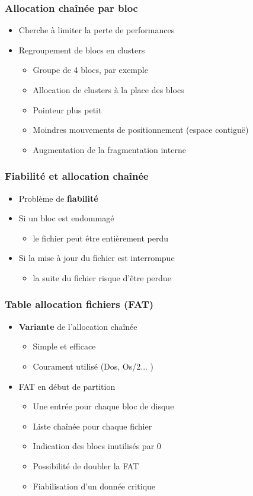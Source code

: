 \begin{frame}
\frametitle{Allocation chaînée par bloc}
\begin{itemize}
\item Cherche à limiter la perte de performances
\item Regroupement de blocs en clusters
\begin{itemize}
\item Groupe de 4 blocs, par exemple
\item Allocation de clusters à la place des blocs
\item Pointeur plus petit
\item Moindres mouvements de positionnement (espace contiguë)
\item Augmentation de la fragmentation interne
\end{itemize}
\end{itemize}
\end{frame}

\begin{frame}
\frametitle{Fiabilité et allocation chaînée}
\begin{itemize}
\item Problème de \textbf{fiabilité}
\item Si un bloc est endommagé
\begin{itemize}
\item le fichier peut être entièrement perdu
\end{itemize}
\item Si la mise à jour du fichier est interrompue
\begin{itemize}
\item la suite du fichier risque d'être perdue
\end{itemize}
\end{itemize}
\end{frame}

\begin{frame}
\frametitle{Table allocation fichiers (FAT)}
\begin{itemize}
\item \textbf{Variante} de l'allocation chaînée
\begin{itemize}
\item Simple et efficace
\item Courament utilisé (Dos, Os/2... )
\end{itemize}
\item FAT en début de partition
\begin{itemize}
\item Une entrée pour chaque bloc de disque
\item Liste chaînée pour chaque fichier
\item Indication des blocs inutilisés par 0
\item Possibilité de doubler la FAT
\item Fiabilisation d'un donnée critique\textbf{}
\end{itemize}
\end{itemize}
\end{frame}

